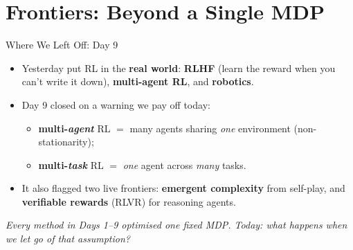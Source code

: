 \section{Frontiers: Beyond a Single MDP}


\newcommand{\srcnote}[1]{%
  \begingroup
  \renewcommand{\thefootnote}{}%
  \footnote{#1}%
  \addtocounter{footnote}{-1}%
  \endgroup}

\begin{frame}{Where We Left Off: Day 9}
\begin{itemize}\itemsep0.5em
    \item Yesterday put RL in the \textbf{real world}: \textbf{RLHF} (learn the reward
          when you can't write it down), \textbf{multi-agent RL}, and \textbf{robotics}.
    \item Day 9 closed on a warning we pay off today:
          \begin{itemize}
              \item \textbf{multi-\emph{agent}} RL $=$ many agents sharing \emph{one}
                    environment (non-stationarity);
              \item \textbf{multi-\emph{task}} RL $=$ \emph{one} agent across \emph{many}
                    tasks. 
          \end{itemize}
    \item It also flagged two live frontiers: \textbf{emergent complexity} from self-play,
          and \textbf{verifiable rewards} (RLVR) for reasoning agents.
\end{itemize}
\vfill
\begin{center}
\itshape Every method in Days 1--9 optimised \emph{one} fixed MDP. Today: what happens when
we let go of that assumption?
\end{center}
\end{frame}

